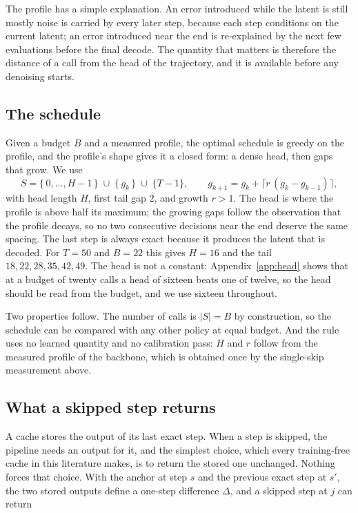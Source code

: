The profile has a simple explanation. An error introduced while the latent is still mostly noise is carried by every later step, because each step conditions on the current latent; an error introduced near the end is re-explained by the next few evaluations before the final decode. The quantity that matters is therefore the distance of a call from the head of the trajectory, and it is available before any denoising starts.

\subsection{The schedule}
\label{sec:control}
Given a budget $B$ and a measured profile, the optimal schedule is greedy on the profile, and the profile's shape gives it a closed form: a dense head, then gaps that grow. We use
\begin{equation}
 S=\{\,0,\ldots,H-1\,\}\;\cup\;\{\,g_k\,\}\;\cup\;\{T-1\},
 \qquad
 g_{k+1}=g_k+\lceil r\,(g_k-g_{k-1})\rceil ,
 \label{eq:sched}
\end{equation}
with head length $H$, first tail gap $2$, and growth $r>1$. The head is where the profile is above half its maximum; the growing gaps follow the observation that the profile decays, so no two consecutive decisions near the end deserve the same spacing. The last step is always exact because it produces the latent that is decoded. For $T=50$ and $B=22$ this gives $H=16$ and the tail $18,22,28,35,42,49$. The head is not a constant: Appendix~\ref{app:head} shows that at a budget of twenty calls a head of sixteen beats one of twelve, so the head should be read from the budget, and we use sixteen throughout.

Two properties follow. The number of calls is $|S|=B$ by construction, so the schedule can be compared with any other policy at equal budget. And the rule uses no learned quantity and no calibration pass: $H$ and $r$ follow from the measured profile of the backbone, which is obtained once by the single-skip measurement above.

\subsection{What a skipped step returns}
\label{sec:reuse}

A cache stores the output of its last exact step. When a step is skipped, the pipeline needs an
output for it, and the simplest choice, which every training-free cache in this literature makes,
is to return the stored one unchanged. Nothing forces that choice. With the anchor at step $s$
and the previous exact step at $s'$, the two stored outputs define a one-step difference
$\Delta$, and a skipped step at $j$ can return

